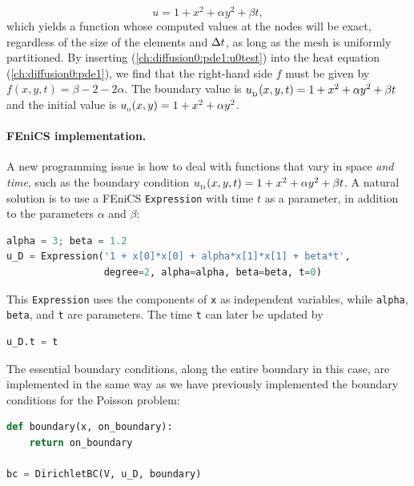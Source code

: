 \documentclass[graybox,envcountchap,sectrefs,final]{svmonodo}
\begin{document}
\begin{equation} u = 1 + x^2 + \alpha y^2 + \beta t,
\label{ch:diffusion0:pde1:u0test}
\end{equation}
which yields a function whose computed values at the nodes will be
exact, regardless of the size of the elements and $\dt$, as long as
the mesh is uniformly partitioned. By inserting
(\ref{ch:diffusion0:pde1:u0test}) into the heat equation
(\ref{ch:diffusion0:pde1}), we find that the right-hand side $f$ must
be given by $f(x,y,t)=\beta - 2 - 2\alpha$. The boundary value
is $\ub(x, y, t) = 1 + x^2 + \alpha y^2 + \beta t$ and the initial
value is $\uI(x, y) = 1 + x^2 + \alpha y^2$.

\paragraph{FEniCS implementation.}
A new programming issue is how to deal with functions that vary in
space \emph{and time}, such as the boundary condition $\ub(x, y,
t) = 1 + x^2 + \alpha y^2 + \beta t$. A natural solution is to use a
FEniCS \texttt{Expression} with time $t$ as a parameter, in addition to the
parameters $\alpha$ and $\beta$:


\begin{lstlisting}[language=Python,style=graycolor]
alpha = 3; beta = 1.2
u_D = Expression('1 + x[0]*x[0] + alpha*x[1]*x[1] + beta*t',
                 degree=2, alpha=alpha, beta=beta, t=0)
\end{lstlisting}
This \texttt{Expression} uses the components of \texttt{x} as independent
variables, while \texttt{alpha}, \texttt{beta}, and \texttt{t} are parameters. The
time \texttt{t} can later be updated by

\begin{lstlisting}[language=Python,style=graycolor]
u_D.t = t
\end{lstlisting}

The essential boundary conditions, along the entire boundary in this case,
are implemented in the same way as we have previously implemented the
boundary conditions for the Poisson problem:

\begin{lstlisting}[language=Python,style=graycolor]
def boundary(x, on_boundary):
    return on_boundary

bc = DirichletBC(V, u_D, boundary)
\end{lstlisting}
\end{document}

